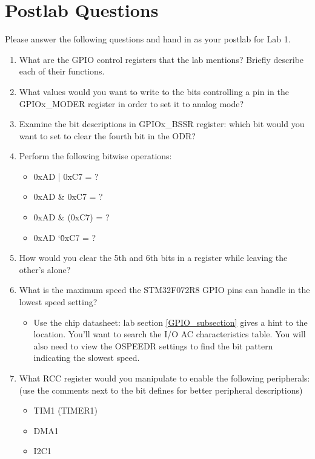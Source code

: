 \documentclass[openany,11pt,fleqn]{book} %
\newcommand\XOR{\char`\^}
\begin{document}
\section{\color{blue}Postlab Questions}
\begin{question}[Postlab 1]
	Please answer the following questions and hand in as your postlab for Lab 1.
	\begin{enumerate}
		\item What are the GPIO control registers that the lab mentions? Briefly describe each of their functions.
		\item What values would you want to write to the bits controlling a pin in the GPIOx\_MODER register in order to set it to analog mode? 
		\item Examine the bit descriptions in GPIOx\_BSSR register: which bit would you want to set to clear the fourth bit  in the ODR?
		\item Perform the following bitwise operations:
		\begin{itemize}
			\item 0xAD | 0xC7 = ?
			\item 0xAD \& 0xC7 = ?
			\item 0xAD \& \texttildelow(0xC7) = ?
			\item 0xAD \XOR 0xC7 = ?
		\end{itemize}
		\item How would you clear the 5th and 6th bits in a register while leaving the other's alone?
		\item What is the maximum speed the STM32F072R8 GPIO pins can handle in the lowest speed setting?
		\begin{itemize}
			\item Use the chip datasheet: lab section \ref{GPIO_subsection} gives a hint to the location. You'll want to search the I/O AC characteristics table. You will also need to view the OSPEEDR settings to find the bit pattern indicating the slowest speed.
		\end{itemize}
		\item What RCC register would you manipulate to enable the following peripherals: (use the comments next to the bit defines for better peripheral descriptions)
		\begin{itemize}
			\item TIM1 (TIMER1)
			\item DMA1
			\item I2C1
		\end{itemize}
		
	\end{enumerate}
\end{question}
\end{document}
